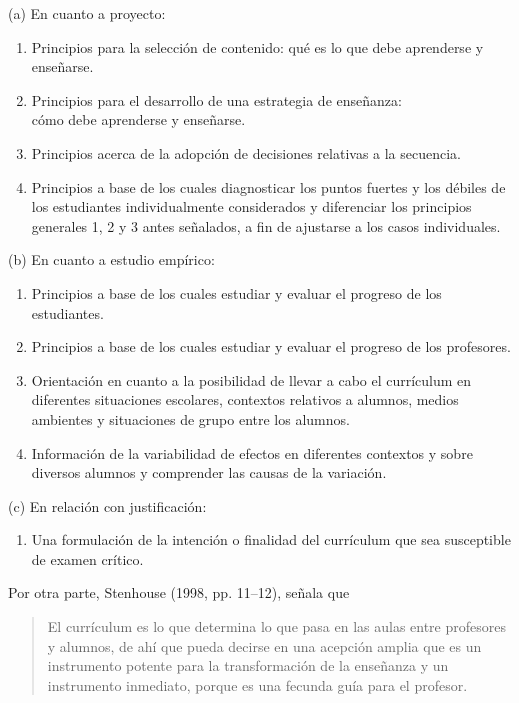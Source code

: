 \begin{Obs}
\item [(a)] En cuanto a proyecto:
\begin{enumerate}
\item Principios para la selección de contenido: qué es lo que debe aprenderse y enseñarse.
\item Principios para el desarrollo de una estrategia de enseñanza:\\ cómo debe 
aprenderse y enseñarse.
\item Principios acerca de la adopción de decisiones relativas a la secuencia.
\item Principios a base de los cuales diagnosticar los puntos fuertes y los débiles de los estudiantes individualmente considerados y diferenciar los principios 
generales 1, 2 y 3 antes señalados, a fin de ajustarse a los casos individuales.
\end{enumerate}
\item  [(b)] En cuanto a estudio empírico:
\begin{enumerate}
\item Principios a base de los cuales estudiar y evaluar el progreso de los estudiantes.
\item Principios a base de los cuales estudiar y evaluar el progreso de los profesores.
\item Orientación en cuanto a la posibilidad de llevar a cabo el currículum en diferentes situaciones escolares, contextos relativos a alumnos, medios ambientes y situaciones de grupo entre los alumnos. 
\item Información de la variabilidad de efectos en diferentes contextos y sobre diversos alumnos y comprender las causas de la variación.
\end{enumerate}
\item  [(c)] En relación con justificación:
\begin{enumerate}
\item Una formulación de la intención o finalidad del currículum que sea susceptible de examen crítico. 
\end{enumerate}
\end{Obs}

Por otra parte, Stenhouse (1998, pp. 11--12), señala que 

\begin{quotation}
El currículum es lo que determina lo que pasa en las aulas entre 
profesores y alumnos, de ahí que pueda decirse en una acepción amplia 
que es un instrumento potente para la transformación de la enseñanza y 
un instrumento inmediato, porque es una fecunda guía para el 
profesor. 
\end{quotation}

